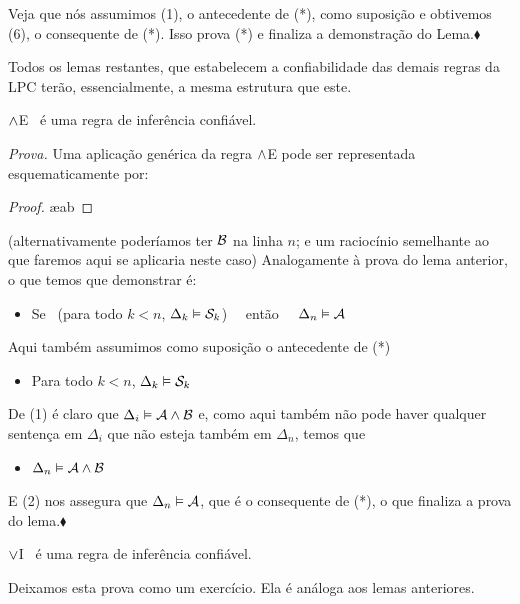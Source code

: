 Veja que nós assumimos (1), o antecedente de (*), como suposição e obtivemos (6), o consequente de (*). Isso prova (*) e finaliza a demonstração do Lema.$\blacklozenge$

Todos os lemas restantes, que estabelecem a confiabilidade das demais regras da LPC terão, essencialmente, a mesma estrutura que este.

\begin{factoidboxe}
	$\wedge$E \ é uma regra de inferência confiável.
\end{factoidboxe}

\noindent\emph{Prova.}
Uma aplicação genérica da regra $\wedge$E pode ser representada esquematicamente por:
	\begin{proof}
		 \ae{ab}
	\end{proof}\noindent
(alternativamente poderíamos ter $\mathcal{B}$ na linha $n$; e um raciocínio semelhante ao que faremos aqui se aplicaria neste caso)
Analogamente à prova do lema anterior, o que temos que demonstrar é:
\begin{itemize}
	\item[(*)]  Se  \ ({para todo}  $k<n$, $\Delta_k \vDash \mathcal{S}_k$) \ \ então \ \ $\Delta_n \vDash \mathcal{A}$
\end{itemize}
Aqui também assumimos como suposição o antecedente de (*)
\begin{itemize}
	\item[(1)] Para todo  $k<n$, $\Delta_k \vDash \mathcal{S}_k$
\end{itemize}
De (1) é claro que $\Delta_i \vDash \mathcal{A} \wedge \mathcal{B}$ e, como aqui também não pode haver qualquer sentença em $\Delta_i$ que não esteja também em $\Delta_n$, temos que
\begin{itemize}
	\item[(2)] $\Delta_n \vDash \mathcal{A} \wedge \mathcal{B}$
\end{itemize}
E (2) nos assegura que $\Delta_n \vDash \mathcal{A}$, que é o consequente de (*), o que finaliza a prova do lema.$\blacklozenge$

\begin{factoidboxe}
	$\vee$I \ é uma regra de inferência confiável.
\end{factoidboxe}

Deixamos esta prova como um exercício.
Ela é análoga aos lemas anteriores.

